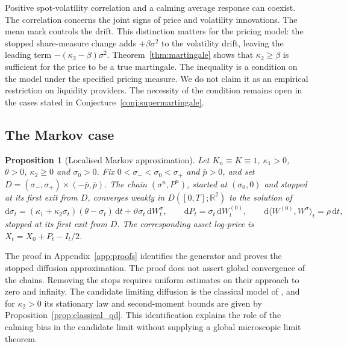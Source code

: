 \documentclass[11pt,a4paper]{article}
\newtheorem{proposition}[theorem]{Proposition}
\theoremstyle{definition}
\newcommand{\D}{\mathrm{d}}
\begin{document}
Positive spot-volatility correlation and a calming average response can coexist. The correlation concerns the joint signs of price and volatility innovations. The mean mark controls the drift. This distinction matters for the pricing model: the stopped share-measure change adds $+\beta\sigma^2$ to the volatility drift, leaving the leading term $-(\kappa_2-\beta)\sigma^2$. Theorem~\ref{thm:martingale} shows that $\kappa_2\ge\beta$ is sufficient for the price to be a true martingale. The inequality is a condition on the model under the specified pricing measure. We do not claim it as an empirical restriction on liquidity providers. The necessity of the condition remains open in the cases stated in Conjecture~\ref{conj:supermartingale}.

\subsection{The Markov case}\label{sec:micro_markov}

\begin{proposition}[Localised Markov approximation]\label{prop:markov}
Let $K_n\equiv K\equiv1$, $\kappa_1>0$, $\theta>0$, $\kappa_2\ge0$ and $\sigma_0>0$. Fix $0<\sigma_-<\sigma_0<\sigma_+$ and $\bar p>0$, and set $D=(\sigma_-,\sigma_+)\times(-\bar p,\bar p)$. The chain $(\sigma^n,P^n)$, started at $(\sigma_0,0)$ and stopped at its first exit from $D$, converges weakly in $D([0,T];\mathbb R^2)$ to the solution of
\begin{equation}\label{eq:markov_limit}
\D\sigma_t=(\kappa_1+\kappa_2\sigma_t)(\theta-\sigma_t)\,\D t+\vartheta\sigma_t\,\D W^\sigma_t,\qquad \D P_t=\sigma_t\,\D W^{(0)}_t,\qquad \D\langle W^{(0)},W^\sigma\rangle_t=\rho\,\D t,
\end{equation}
stopped at its first exit from $D$. The corresponding asset log-price is $X_t=X_0+P_t-I_t/2$.
\end{proposition}

The proof in Appendix~\ref{app:proofs} identifies the generator and proves the stopped diffusion approximation. The proof does not assert global convergence of the chains. Removing the stops requires uniform estimates on their approach to zero and infinity. The candidate limiting diffusion is the classical model of \citet{SeppRakhmonov2023}, and for $\kappa_2>0$ its stationary law and second-moment bounds are given by Proposition~\ref{prop:classical_qd}. This identification explains the role of the calming bias in the candidate limit without supplying a global microscopic limit theorem.
\end{document}
